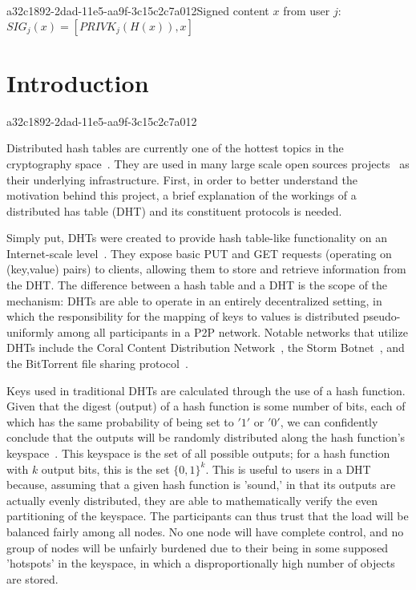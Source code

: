 \documentclass[12pt]{article}
\begin{document}
a32c1892-2dad-11e5-aa9f-3c15c2c7a012Signed content $x$ from user $j$: $SIG_j(x) = \left[ PRIVK_j( H(x) ), x \right]$

\section{Introduction}
a32c1892-2dad-11e5-aa9f-3c15c2c7a012\par Distributed hash tables are currently one of the hottest topics in the cryptography space~\cite{Stoica:2001dj,Rowstron:2001ea,Ratnasamy:2001wn}. They are used in many large scale open sources projects~\cite{Freitas:2013tb,Xu:2010vs,Perfitt:2010fh} as their underlying infrastructure. First, in order to better understand the motivation behind this project, a brief explanation of the workings of a distributed has table (DHT) and its constituent protocols is needed.

\par Simply put, DHTs were created to provide hash table-like functionality on an Internet-scale level~\cite{Ratnasamy:2001wn}. They expose basic PUT and GET requests (operating on (key,value) pairs) to clients, allowing them to store and retrieve information from the DHT. The difference between a hash table and a DHT is the scope of the mechanism: DHTs are able to operate in an entirely decentralized setting, in which the responsibility for the mapping of keys to values is distributed pseudo-uniformly among all participants in a P2P network. Notable networks that utilize DHTs include the Coral Content Distribution Network~\cite{Freedman:2004vb}, the Storm Botnet~\cite{Holz:2008uk}, and the BitTorrent file sharing protocol~\cite{Cohen:y1_8mBnw}.

\par Keys used in traditional DHTs are calculated through the use of a hash function. Given that the digest (output) of a hash function is some number of bits, each of which has the same probability of being set to $'1'$ or $'0'$, we can confidently conclude that the outputs will be randomly distributed along the hash function's keyspace~. This keyspace is the set of all possible outputs; for a hash function with $k$ output bits, this is the set $\{0,1\}^k$. This is useful to users in a DHT because, assuming that a given hash function is 'sound,' in that its outputs are actually evenly distributed, they are able to mathematically verify the even partitioning of the keyspace. The participants can thus trust that the load will be balanced fairly among all nodes. No one node will have complete control, and no group of nodes will be unfairly burdened due to their being in some supposed 'hotspots' in the keyspace, in which a disproportionally high number of objects are stored.~
\end{document}
